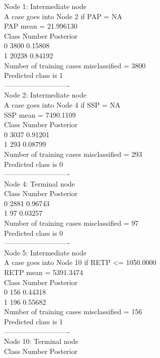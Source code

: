 \documentclass[12pt]{article}
\begin{document}
Node 1: Intermediate node\\
 A case goes into Node 2 if PAP = NA\\
 PAP mean = 21.996130\\
 Class      Number   Posterior\\
 0            3800     0.15808\\
 1           20238     0.84192\\
 Number of training cases misclassified = 3800\\
 Predicted class is 1\\
 ----------------------------\\
Node 2: Intermediate node\\
 A case goes into Node 4 if SSP = NA\\
 SSP mean = 7490.1109\\
 Class      Number   Posterior\\
 0            3037     0.91201\\
 1             293     0.08799\\
 Number of training cases misclassified = 293\\
 Predicted class is 0\\
 ----------------------------\\
Node 4: Terminal node\\
 Class      Number   Posterior\\
 0            2881     0.96743\\
 1              97     0.03257\\
 Number of training cases misclassified = 97\\
 Predicted class is 0\\
 ----------------------------\\
Node 5: Intermediate node\\
 A case goes into Node 10 if RETP <= 1050.0000\\
 RETP mean = 5391.3474\\
 Class      Number   Posterior\\
 0             156     0.44318\\
 1             196     0.55682\\
 Number of training cases misclassified = 156\\
 Predicted class is 1\\
 ----------------------------\\
Node 10: Terminal node\\
 Class      Number   Posterior\\
\end{document}
